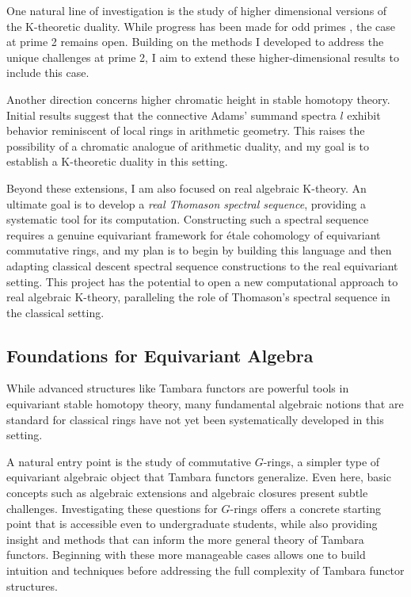 \documentclass[11pt]{article}
\begin{document}
One natural line of investigation is the study of higher dimensional versions of the K-theoretic duality.
While progress has been made for odd primes \cite{Braunling}, the case at prime 2 remains open.
Building on the methods I developed to address the unique challenges at prime 2, I aim to extend these higher-dimensional results to include this case.

Another direction concerns higher chromatic height in stable homotopy theory.
Initial results \cite{HRW} suggest that the connective Adams' summand spectra $l$ exhibit behavior reminiscent of local rings in arithmetic geometry.
This raises the possibility of a chromatic analogue of arithmetic duality, and my goal is to establish a K-theoretic duality in this setting.

Beyond these extensions, I am also focused on real algebraic K-theory.
An ultimate goal is to develop a {\it real Thomason spectral sequence}, providing a systematic tool for its computation.
Constructing such a spectral sequence requires a genuine equivariant framework for \'etale cohomology of equivariant commutative rings, and my plan is to begin by building this language and then adapting classical descent spectral sequence constructions to the real equivariant setting.
This project has the potential to open a new computational approach to real algebraic K-theory, paralleling the role of Thomason’s spectral sequence in the classical setting.


\subsection*{Foundations for Equivariant Algebra}
While advanced structures like Tambara functors are powerful tools in equivariant stable homotopy theory, many fundamental algebraic notions that are standard for classical rings have not yet been systematically developed in this setting.

A natural entry point is the study of commutative $G$-rings, a simpler type of equivariant algebraic object that Tambara functors generalize.
Even here, basic concepts such as algebraic extensions and algebraic closures present subtle challenges.
Investigating these questions for $G$-rings offers a concrete starting point that is accessible even to undergraduate students, while also providing insight and methods that can inform the more general theory of Tambara functors.
Beginning with these more manageable cases allows one to build intuition and techniques before addressing the full complexity of Tambara functor structures.
\end{document}
